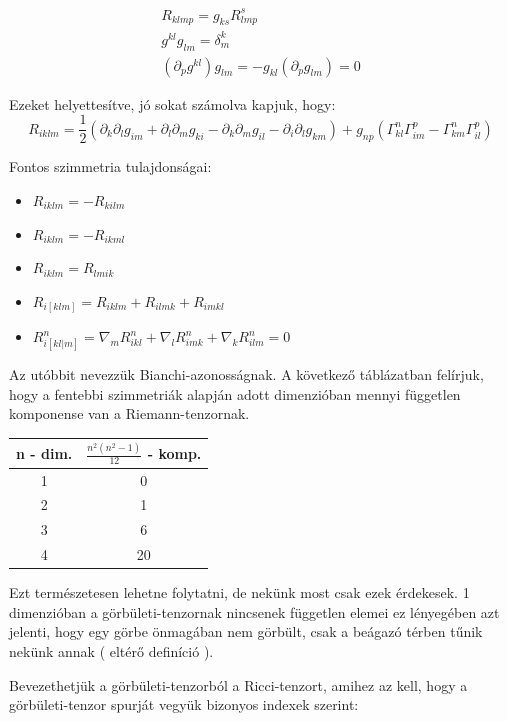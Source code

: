 \documentclass[a4paper,12pt]{article}
\begin{document}
\begin{align*}
    R_{klmp} = g_{ks}R^{s}_{lmp} \\
    g^{kl}g_{lm} = \delta^{k}_{m} \\
    (\partial_{p}g^{kl})g_{lm} = -g_{kl}(\partial_{p}g_{lm}) = 0
\end{align*}
\par Ezeket helyettesítve, jó sokat számolva kapjuk, hogy:
\begin{equation*}
    R_{iklm} = \frac{1}{2}(\partial_{k}\partial_{l}g_{im} + \partial_{l}\partial_{m}g_{ki} - \partial_{k}\partial_{m}g_{il} - \partial_{i}\partial_{l}g_{km}) + g_{np}(\Gamma_{kl}^{n}\Gamma_{im}^{p} - \Gamma_{km}^{n}\Gamma_{il}^{p})
\end{equation*}
\par Fontos szimmetria tulajdonságai:
\begin{itemize}
    \item $R_{iklm} = -R_{kilm}$
    \item $R_{iklm} = -R_{ikml}$
    \item $R_{iklm} = R_{lmik}$
    \item $R_{i[klm]} = R_{iklm} + R_{ilmk} + R_{imkl}$
    \item $R_{i[kl|m]}^{n} = \nabla_{m}R^{n}_{ikl} + \nabla_{l}R^{n}_{imk} + \nabla_{k}R^{n}_{ilm} = 0$
\end{itemize}
\par Az utóbbit nevezzük Bianchi-azonosságnak. A következő táblázatban felírjuk, hogy a fentebbi szimmetriák alapján adott dimenzióban mennyi független komponense van a Riemann-tenzornak.
\begin{center}
\begin{tabular}{|c|c|}
    \hline
    n - dim. & $\frac{n^{2}(n^{2}-1)}{12}$ - komp. \\
    \hline
    1 &  0\\
    \hline
    2 & 1 \\
    \hline
    3 & 6 \\
    \hline
    4 & 20 \\
    \hline
\end{tabular}
\end{center}
\par Ezt természetesen lehetne folytatni, de nekünk most csak ezek érdekesek. 1 dimenzióban a görbületi-tenzornak nincsenek független elemei ez lényegében azt jelenti, hogy egy görbe önmagában nem görbült, csak a beágazó térben tűnik nekünk annak ( eltérő definíció ).
\par Bevezethetjük a görbületi-tenzorból a Ricci-tenzort, amihez az kell, hogy a görbületi-tenzor spurját vegyük bizonyos indexek szerint:
\end{document}
